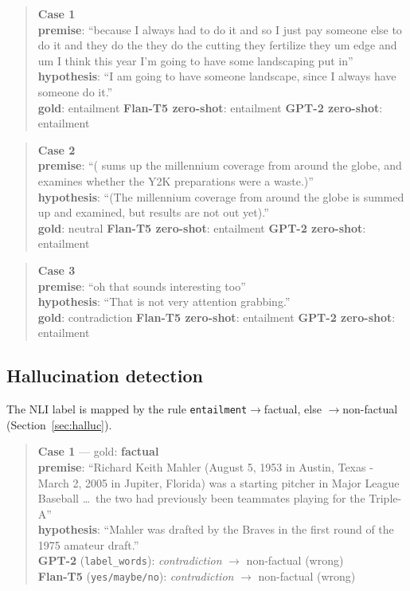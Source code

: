 \documentclass[11pt]{article}
\begin{document}
\begin{quote}\small
\textbf{Case 1}\\
\textbf{premise}: ``because I always had to do it and so I just pay someone else to do it
and they do the they do the cutting they fertilize they um edge and um I think this year
I'm going to have some landscaping put in''\\
\textbf{hypothesis}: ``I am going to have someone landscape, since I always have someone
do it.''\\
\textbf{gold}: entailment \quad\textbf{Flan-T5 zero-shot}: entailment \quad\textbf{GPT-2
zero-shot}: entailment
\end{quote}

\begin{quote}\small
\textbf{Case 2}\\
\textbf{premise}: ``( sums up the millennium coverage from around the globe, and examines
whether the Y2K preparations were a waste.)''\\
\textbf{hypothesis}: ``(The millennium coverage from around the globe is summed up and
examined, but results are not out yet).''\\
\textbf{gold}: neutral \quad\textbf{Flan-T5 zero-shot}: entailment \quad\textbf{GPT-2
zero-shot}: entailment
\end{quote}

\begin{quote}\small
\textbf{Case 3}\\
\textbf{premise}: ``oh that sounds interesting too''\\
\textbf{hypothesis}: ``That is not very attention grabbing.''\\
\textbf{gold}: contradiction \quad\textbf{Flan-T5 zero-shot}: entailment \quad\textbf{GPT-2
zero-shot}: entailment
\end{quote}

\subsection{Hallucination detection}
The NLI label is mapped by the rule \texttt{entailment}$\to$factual, else $\to$non-factual
(Section~\ref{sec:halluc}).

\begin{quote}\small
\textbf{Case 1} --- gold: \textbf{factual}\\
\textbf{premise}: ``Richard Keith Mahler (August 5, 1953 in Austin, Texas - March 2, 2005
in Jupiter, Florida) was a starting pitcher in Major League Baseball \dots\ the two had
previously been teammates playing for the Triple-A''\\
\textbf{hypothesis}: ``Mahler was drafted by the Braves in the first round of the 1975
amateur draft.''\\
\textbf{GPT-2} (\texttt{label\_words}): \emph{contradiction} $\to$ non-factual (wrong)\\
\textbf{Flan-T5} (\texttt{yes/maybe/no}): \emph{contradiction} $\to$ non-factual (wrong)
\end{quote}
\end{document}
